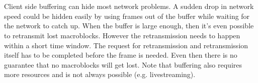 \section[What would be the advantages and disadvantages of client-side buffering?]{}

Client side buffering can hide most network problems. A sudden drop in network speed could be hidden easily by using frames out of the buffer while waiting for the network to catch up. When the buffer is large enough, then it's even possible to retransmit lost macroblocks. However the retransmission needs to happen within a short time window. The request for retransmission and retransmission itself has to be completed before the frame is needed. Even then there is no guarantee that no macroblocks will get lost. Note that buffering also requires more resources and is not always possible (e.g. livestreaming).
